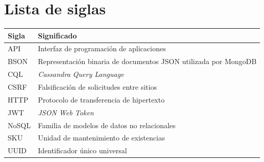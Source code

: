 \chapter*{Lista de siglas}

\noindent\begin{tabularx}{\textwidth}{@{}p{2.5cm}Y@{}}
  \toprule
  \textbf{Sigla} & \textbf{Significado} \\
  \midrule
  API & Interfaz de programación de aplicaciones \\
  BSON & Representación binaria de documentos JSON utilizada por MongoDB \\
  CQL & \emph{Cassandra Query Language} \\
  CSRF & Falsificación de solicitudes entre sitios \\
  HTTP & Protocolo de transferencia de hipertexto \\
  JWT & \emph{JSON Web Token} \\
  NoSQL & Familia de modelos de datos no relacionales \\
  SKU & Unidad de mantenimiento de existencias \\
  UUID & Identificador único universal \\
  \bottomrule
\end{tabularx}
